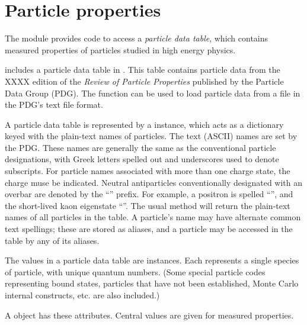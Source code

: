 \chapter{Particle properties}

The  module provides code to access a \emph{particle
data table}, which contains measured properties of particles studied in
high energy physics.  

\pyhep includes a particle data table in .  This
table contains particle data from the XXXX edition of the \textit{Review
of Particle Properties} published by the Particle Data Group (PDG).  The
function  can be used to load particle
data from a file in the PDG's text file format.

A particle data table is represented by a 
instance, which acts as a dictionary keyed with the plain-text names of
particles.  The text (ASCII) names are set by the PDG.  These names are
generally the same as the conventional particle designations, with Greek
letters spelled out and underscores used to denote subscripts.  For
particle names associated with more than one charge state, the charge
muse be indicated.  Neutral antiparticles conventionally designated with
an overbar are denoted by the ``'' prefix.  For example, a
positron is spelled ``'', and the short-lived kaon eigenstate
``''.  The usual  method will return the
plain-text names of all particles in the table.  A particle's name may
have alternate common text spellings; these are stored as aliases, and a
particle may be accessed in the table by any of its aliases.

The values in a particle data table are 
instances.  Each represents a single species of particle, with unique
quantum numbers.  (Some special particle codes representing bound
states, particles that have not been established, Monte Carlo internal
constructs, etc. are also included.)  

A  object has these attributes.  Central values are
given for measured properties.

